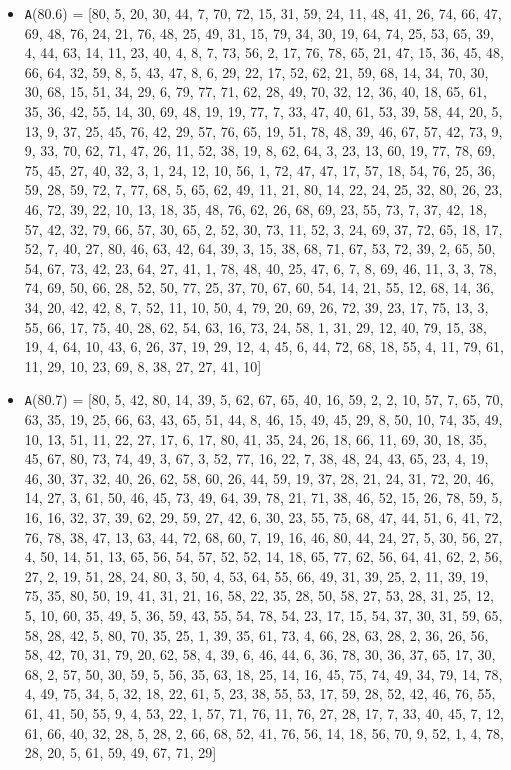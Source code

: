 \documentclass[runningheads, a4paper]{llncs}
\begin{document}
\begin{itemize}
	\item {\texttt A(80.6) = } [80, 5, 20, 30, 44, 7, 70, 72, 15, 31, 59, 24, 11, 48, 41, 26, 74, 66, 47, 69, 48, 76, 24, 21, 76, 48, 25, 49, 31, 15, 79, 34, 30, 19, 64, 74, 25, 53, 65, 39, 4, 44, 63, 14, 11, 23, 40, 4, 8, 7, 73, 56, 2, 17, 76, 78, 65, 21, 47, 15, 36, 45, 48, 66, 64, 32, 59, 8, 5, 43, 47, 8, 6, 29, 22, 17, 52, 62, 21, 59, 68, 14, 34, 70, 30, 30, 68, 15, 51, 34, 29, 6, 79, 77, 71, 62, 28, 49, 70, 32, 12, 36, 40, 18, 65, 61, 35, 36, 42, 55, 14, 30, 69, 48, 19, 19, 77, 7, 33, 47, 40, 61, 53, 39, 58, 44, 20, 5, 13, 9, 37, 25, 45, 76, 42, 29, 57, 76, 65, 19, 51, 78, 48, 39, 46, 67, 57, 42, 73, 9, 9, 33, 70, 62, 71, 47, 26, 11, 52, 38, 19, 8, 62, 64, 3, 23, 13, 60, 19, 77, 78, 69, 75, 45, 27, 40, 32, 3, 1, 24, 12, 10, 56, 1, 72, 47, 47, 17, 57, 18, 54, 76, 25, 36, 59, 28, 59, 72, 7, 77, 68, 5, 65, 62, 49, 11, 21, 80, 14, 22, 24, 25, 32, 80, 26, 23, 46, 72, 39, 22, 10, 13, 18, 35, 48, 76, 62, 26, 68, 69, 23, 55, 73, 7, 37, 42, 18, 57, 42, 32, 79, 66, 57, 30, 65, 2, 52, 30, 73, 11, 52, 3, 24, 69, 37, 72, 65, 18, 17, 52, 7, 40, 27, 80, 46, 63, 42, 64, 39, 3, 15, 38, 68, 71, 67, 53, 72, 39, 2, 65, 50, 54, 67, 73, 42, 23, 64, 27, 41, 1, 78, 48, 40, 25, 47, 6, 7, 8, 69, 46, 11, 3, 3, 78, 74, 69, 50, 66, 28, 52, 50, 77, 25, 37, 70, 67, 60, 54, 14, 21, 55, 12, 68, 14, 36, 34, 20, 42, 42, 8, 7, 52, 11, 10, 50, 4, 79, 20, 69, 26, 72, 39, 23, 17, 75, 13, 3, 55, 66, 17, 75, 40, 28, 62, 54, 63, 16, 73, 24, 58, 1, 31, 29, 12, 40, 79, 15, 38, 19, 4, 64, 10, 43, 6, 26, 37, 19, 29, 12, 4, 45, 6, 44, 72, 68, 18, 55, 4, 11, 79, 61, 11, 29, 10, 23, 69, 8, 38, 27, 27, 41, 10]
	\item {\texttt A(80.7) = } [80, 5, 42, 80, 14, 39, 5, 62, 67, 65, 40, 16, 59, 2, 2, 10, 57, 7, 65, 70, 63, 35, 19, 25, 66, 63, 43, 65, 51, 44, 8, 46, 15, 49, 45, 29, 8, 50, 10, 74, 35, 49, 10, 13, 51, 11, 22, 27, 17, 6, 17, 80, 41, 35, 24, 26, 18, 66, 11, 69, 30, 18, 35, 45, 67, 80, 73, 74, 49, 3, 67, 3, 52, 77, 16, 22, 7, 38, 48, 24, 43, 65, 23, 4, 19, 46, 30, 37, 32, 40, 26, 62, 58, 60, 26, 44, 59, 19, 37, 28, 21, 24, 31, 72, 20, 46, 14, 27, 3, 61, 50, 46, 45, 73, 49, 64, 39, 78, 21, 71, 38, 46, 52, 15, 26, 78, 59, 5, 16, 16, 32, 37, 39, 62, 29, 59, 27, 42, 6, 30, 23, 55, 75, 68, 47, 44, 51, 6, 41, 72, 76, 78, 38, 47, 13, 63, 44, 72, 68, 60, 7, 19, 16, 46, 80, 44, 24, 27, 5, 30, 56, 27, 4, 50, 14, 51, 13, 65, 56, 54, 57, 52, 52, 14, 18, 65, 77, 62, 56, 64, 41, 62, 2, 56, 27, 2, 19, 51, 28, 24, 80, 3, 50, 4, 53, 64, 55, 66, 49, 31, 39, 25, 2, 11, 39, 19, 75, 35, 80, 50, 19, 41, 31, 21, 16, 58, 22, 35, 28, 50, 58, 27, 53, 28, 31, 25, 12, 5, 10, 60, 35, 49, 5, 36, 59, 43, 55, 54, 78, 54, 23, 17, 15, 54, 37, 30, 31, 59, 65, 58, 28, 42, 5, 80, 70, 35, 25, 1, 39, 35, 61, 73, 4, 66, 28, 63, 28, 2, 36, 26, 56, 58, 42, 70, 31, 79, 20, 62, 58, 4, 39, 6, 46, 44, 6, 36, 78, 30, 36, 37, 65, 17, 30, 68, 2, 57, 50, 30, 59, 5, 56, 35, 63, 18, 25, 14, 16, 45, 75, 74, 49, 34, 79, 14, 78, 4, 49, 75, 34, 5, 32, 18, 22, 61, 5, 23, 38, 55, 53, 17, 59, 28, 52, 42, 46, 76, 55, 61, 41, 50, 55, 9, 4, 53, 22, 1, 57, 71, 76, 11, 76, 27, 28, 17, 7, 33, 40, 45, 7, 12, 61, 66, 40, 32, 28, 5, 28, 2, 66, 68, 52, 41, 76, 56, 14, 18, 56, 70, 9, 52, 1, 4, 78, 28, 20, 5, 61, 59, 49, 67, 71, 29]

\end{itemize}
\end{document}
